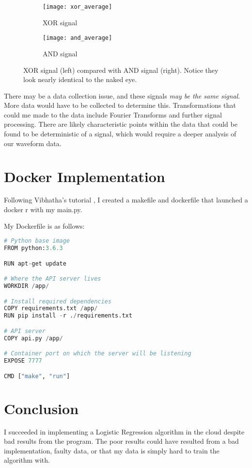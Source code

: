 \documentclass{article}
\begin{document}
\begin{figure}[h]
    \begin{subfigure}{0.5\textwidth}
    \texttt{[image: xor\_average]}
    \caption{XOR signal}
    \label{fig:subim1}
    \end{subfigure}
    \begin{subfigure}{0.5\textwidth}
    \texttt{[image: and\_average]}
    \caption{AND signal}
    \label{fig:subim2}
    \end{subfigure}
 
\caption{XOR signal (left) compared with AND signal (right). Notice they look nearly identical to the naked eye.}
\label{fig:image2}
\end{figure}

There may be a data collection issue, and these signals \emph{may be the same signal}. More data would have to be collected to determine this. Transformations that could me made to the data include Fourier Transforms and further signal processing. There are likely characteristic points within the data that could be found to be deterministic of a signal, which would require a deeper analysis of our waveform data.

\section{Docker Implementation}

Following Vibhatha's tutorial \cite{abeykoon_2018}, I created a makefile and dockerfile that launched a docker r with my main.py. 

My Dockerfile is as follows:

\begin{lstlisting}[language=python]
# Python base image
FROM python:3.6.3

RUN apt-get update

# Where the API server lives
WORKDIR /app/

# Install required dependencies
COPY requirements.txt /app/
RUN pip install -r ./requirements.txt

# API server
COPY api.py /app/

# Container port on which the server will be listening
EXPOSE 7777

CMD ["make", "run"]
\end{lstlisting}

\section{Conclusion}

I succeeded in implementing a Logistic Regression algorithm in the cloud despite bad results from the program. The poor results could have resulted from a bad implementation, faulty data, or that my data is simply hard to train the algorithm with. 

\printbibliography
\end{document}
